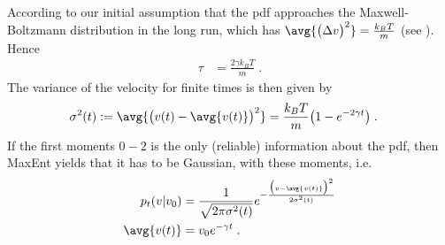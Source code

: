 %
According to our initial assumption that the pdf approaches the Maxwell-Boltzmann distribution
in the long run, which has $\avg{\big( \Delta v \big)^{2}} = \frac{k_{B}T}{m}$ (see ). Hence
%
\begin{align}
\tau&=  \frac{2 \gamma k_{B}T}{m}\;.
\end{align}
%
The variance of the velocity for finite times is then given by
%
\begin{align*}
\sigma^{2}(t):=\avg{\big( v(t)-\avg{v(t)} \big)^{2}} 
&=
\frac{k_{B} T}{m} \big( 1-e^{-2 \gamma t} \big)\;.
\end{align*}
%
If the first  moments  $0-2$ is the only (reliable) information about the pdf, then MaxEnt yields that it has to be Gaussian, with these moments, i.e.
%
\begin{align}
p_{t}(v|v_{0}) &= 
\frac{1}{\sqrt{2\pi \sigma^{2}(t)}} e^{-\frac{\big(v-\avg{v(t)}\big)^{2}}{2 \sigma^{2}(t)}}\\
\avg{v(t)} &= v_{0} e^{-\gamma t}\;.
\end{align}
%



